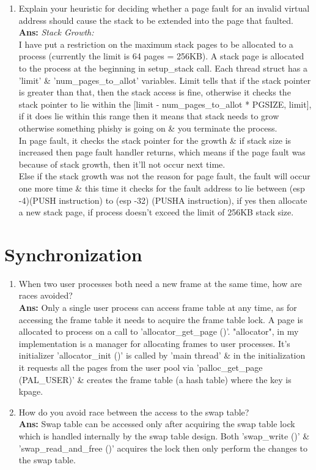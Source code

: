 \documentclass[a4,11pt]{article}
\begin{document}
\begin{enumerate}
\item Explain your heuristic for deciding whether a page fault for an  invalid virtual address should cause the stack to be extended into  the page that faulted. \\
\textbf{Ans:} \textit{ Stack Growth:} \\
	I have put a restriction on the maximum stack pages to be allocated to a process (currently the limit is  64 pages = 256KB). A stack page is allocated to the process at the beginning in setup\_stack call. Each thread struct has a 'limit' \& 'num\_pages\_to\_allot' variables. Limit tells that if the stack pointer  is greater than that, then the stack access is fine, otherwise it checks the stack pointer to lie within the [limit - num\_pages\_to\_allot * PGSIZE, limit], if it does lie within this range then it means that stack needs to grow otherwise something phishy is going on \& you terminate the process. \\
	In page fault, it checks the stack pointer for the growth \& if stack size is increased then page fault handler returns, which means if the page fault was because of stack growth, then it'll not occur next time. \\
	Else if the stack growth was not the reason for page fault, the fault will occur one more time \& this time it checks for the fault address to lie between (esp -4)(PUSH instruction) to (esp -32) (PUSHA instruction), if yes  then allocate a new stack page, if process doesn't exceed the limit of 256KB stack size. \\
\end{enumerate}

\section{Synchronization}
\begin{enumerate}
\item When two user processes both need a new frame at the same time, how are races avoided?\\
\textbf{Ans:} Only a single user process can access frame table at any time, as for accessing the frame table it needs to acquire the frame table lock. A page is allocated to process on a call to 'allocator\_get\_page ()'. "allocator", in my  implementation is a manager for allocating frames to user processes. It's initializer  'allocator\_init ()' is called by 'main thread' \& in the initialization it requests all the  pages from the user pool via 'palloc\_get\_page (PAL\_USER)' \& creates the frame table (a hash table) where the key is kpage.

\item How do you avoid race between the access to the swap table? \\
\textbf{Ans:} Swap table can be accessed only after acquiring the swap table lock which is handled internally by the swap table design. Both 'swap\_write ()' \& 'swap\_read\_and\_free ()' acquires the lock then only perform the changes to the swap table.
\end{enumerate}
\end{document}
